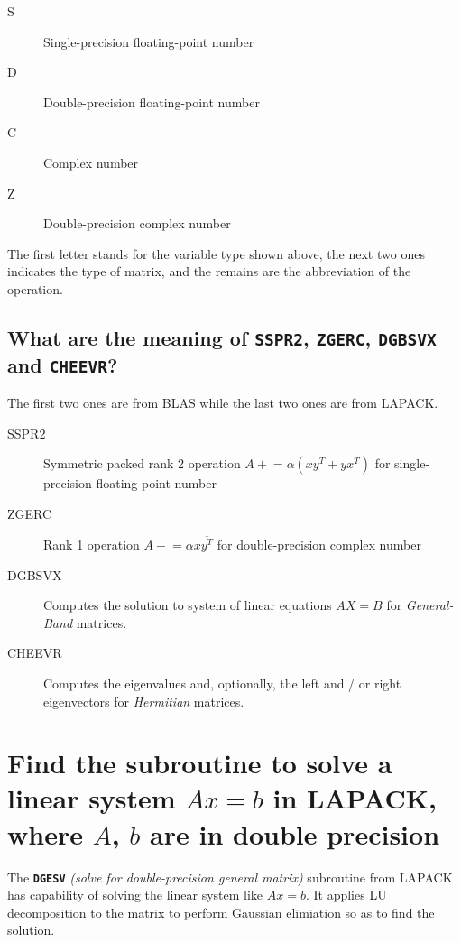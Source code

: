 \documentclass[12pt, a4paper]{article}
\begin{document}
\begin{description}

\item[\ttfamily S] Single-precision floating-point number
\item[\ttfamily D] Double-precision floating-point number
\item[\ttfamily C] Complex number
\item[\ttfamily Z] Double-precision complex number

\end{description}

The first letter stands for the variable type shown above, the next two ones indicates the type of matrix, and the remains are the abbreviation of the operation.

\subsection{What are the meaning of \texttt{SSPR2}, \texttt{ZGERC}, \texttt{DGBSVX} and \texttt{CHEEVR}?}

The first two ones are from \textsf{BLAS} while the last two ones are from \textsf{LAPACK}.

\begin{description}

\item[\ttfamily SSPR2] Symmetric packed rank 2 operation $A\mathrel{+}=\alpha(xy^T+yx^T)$ for single-precision floating-point number
\item[\ttfamily ZGERC] Rank 1 operation $A\mathrel{+}=\alpha x\overline{y^T}$ for double-precision complex number
\item[\ttfamily DGBSVX] Computes the solution to system of linear equations $AX=B$ for \textit{General-Band} matrices.
\item[\ttfamily CHEEVR] Computes the eigenvalues and, optionally, the left and / or right eigenvectors for \textit{Hermitian} matrices.

\end{description}

\section{Find the subroutine to solve a linear system $Ax=b$ in \textsf{LAPACK}, where $A$, $b$ are in double precision}

The \texttt{\bfseries DGESV} \textit{(solve for double-precision general matrix)} subroutine from \textsf{LAPACK} has capability of solving the linear system like $Ax=b$. It applies \textsf{LU decomposition} to the matrix to perform \textsf{Gaussian elimiation} so as to find the solution.
\end{document}
